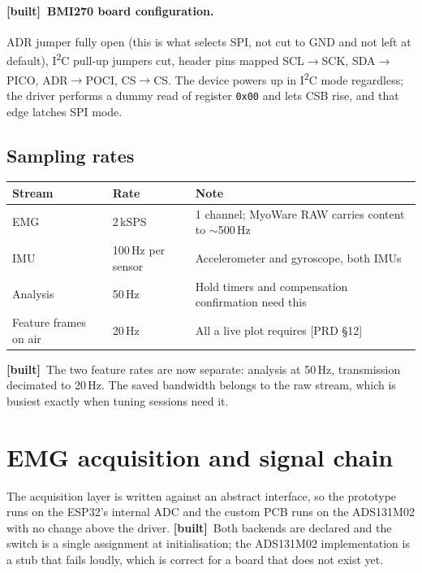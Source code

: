 \documentclass[11pt]{article}
\newcommand{\built}{{\sffamily\scriptsize\color{good}\textbf{[built]}}\ }
\begin{document}
\paragraph{\built BMI270 board configuration.} ADR jumper fully open (this is
what selects SPI, not cut to GND and not left at default),
I\textsuperscript{2}C pull-up jumpers cut, header pins mapped
SCL$\rightarrow$SCK, SDA$\rightarrow$PICO, ADR$\rightarrow$POCI,
CS$\rightarrow$CS. The device powers up in I\textsuperscript{2}C mode
regardless; the driver performs a dummy read of register \texttt{0x00} and
lets CSB rise, and that edge latches SPI mode.

\subsection{Sampling rates}

\begin{table}[H]
\centering\small
\begin{tabularx}{\linewidth}{@{}p{26mm} p{30mm} X@{}}
\toprule
\textbf{Stream} & \textbf{Rate} & \textbf{Note} \\
\midrule
EMG & 2\,kSPS & 1 channel; MyoWare RAW carries content to $\sim$500\,Hz \\
IMU & 100\,Hz per sensor & Accelerometer and gyroscope, both IMUs \\
Analysis & 50\,Hz & Hold timers and compensation confirmation need this \\
Feature frames on air & 20\,Hz & All a live plot requires [PRD \S12] \\
\bottomrule
\end{tabularx}
\end{table}

\noindent
\built The two feature rates are now separate: analysis at 50\,Hz,
transmission decimated to 20\,Hz. The saved bandwidth belongs to the raw
stream, which is busiest exactly when tuning sessions need it.

\section{EMG acquisition and signal chain}

The acquisition layer is written against an abstract interface, so the
prototype runs on the ESP32's internal ADC and the custom PCB runs on the
ADS131M02 with no change above the driver. \built Both backends are declared
and the switch is a single assignment at initialisation; the ADS131M02
implementation is a stub that fails loudly, which is correct for a board that
does not exist yet.
\end{document}
